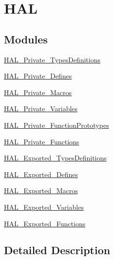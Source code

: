 \hypertarget{group___h_a_l}{}\section{H\+AL}
\label{group___h_a_l}
\subsection*{Modules}
\begin{DoxyCompactItemize}
\item 
\mbox{\hyperlink{group___h_a_l___private___types_definitions}{H\+A\+L\+\_\+\+Private\+\_\+\+Types\+Definitions}}
\item 
\mbox{\hyperlink{group___h_a_l___private___defines}{H\+A\+L\+\_\+\+Private\+\_\+\+Defines}}
\item 
\mbox{\hyperlink{group___h_a_l___private___macros}{H\+A\+L\+\_\+\+Private\+\_\+\+Macros}}
\item 
\mbox{\hyperlink{group___h_a_l___private___variables}{H\+A\+L\+\_\+\+Private\+\_\+\+Variables}}
\item 
\mbox{\hyperlink{group___h_a_l___private___function_prototypes}{H\+A\+L\+\_\+\+Private\+\_\+\+Function\+Prototypes}}
\item 
\mbox{\hyperlink{group___h_a_l___private___functions}{H\+A\+L\+\_\+\+Private\+\_\+\+Functions}}
\item 
\mbox{\hyperlink{group___h_a_l___exported___types_definitions}{H\+A\+L\+\_\+\+Exported\+\_\+\+Types\+Definitions}}
\item 
\mbox{\hyperlink{group___h_a_l___exported___defines}{H\+A\+L\+\_\+\+Exported\+\_\+\+Defines}}
\item 
\mbox{\hyperlink{group___h_a_l___exported___macros}{H\+A\+L\+\_\+\+Exported\+\_\+\+Macros}}
\item 
\mbox{\hyperlink{group___h_a_l___exported___variables}{H\+A\+L\+\_\+\+Exported\+\_\+\+Variables}}
\item 
\mbox{\hyperlink{group___h_a_l___exported___functions}{H\+A\+L\+\_\+\+Exported\+\_\+\+Functions}}
\end{DoxyCompactItemize}


\subsection{Detailed Description}
